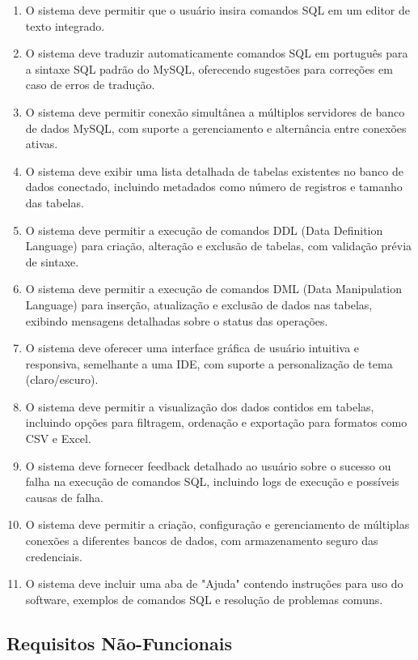 \begin{enumerate}[label=\textbf{RF\arabic*:}, leftmargin=*, align=left]
    \item O sistema deve permitir que o usuário insira comandos SQL em um editor de texto integrado.
    \item O sistema deve traduzir automaticamente comandos SQL em português para a sintaxe SQL padrão do MySQL, oferecendo sugestões para correções em caso de erros de tradução.
    \item O sistema deve permitir conexão simultânea a múltiplos servidores de banco de dados MySQL, com suporte a gerenciamento e alternância entre conexões ativas.
    \item O sistema deve exibir uma lista detalhada de tabelas existentes no banco de dados conectado, incluindo metadados como número de registros e tamanho das tabelas.
    \item O sistema deve permitir a execução de comandos DDL (Data Definition Language) para criação, alteração e exclusão de tabelas, com validação prévia de sintaxe.
    \item O sistema deve permitir a execução de comandos DML (Data Manipulation Language) para inserção, atualização e exclusão de dados nas tabelas, exibindo mensagens detalhadas sobre o status das operações.
    \item O sistema deve oferecer uma interface gráfica de usuário intuitiva e responsiva, semelhante a uma IDE, com suporte a personalização de tema (claro/escuro).
    \item O sistema deve permitir a visualização dos dados contidos em tabelas, incluindo opções para filtragem, ordenação e exportação para formatos como CSV e Excel.
    \item O sistema deve fornecer feedback detalhado ao usuário sobre o sucesso ou falha na execução de comandos SQL, incluindo logs de execução e possíveis causas de falha.
    \item O sistema deve permitir a criação, configuração e gerenciamento de múltiplas conexões a diferentes bancos de dados, com armazenamento seguro das credenciais.
    \item O sistema deve incluir uma aba de "Ajuda" contendo instruções para uso do software, exemplos de comandos SQL e resolução de problemas comuns.
\end{enumerate}

\subsection{Requisitos Não-Funcionais}

